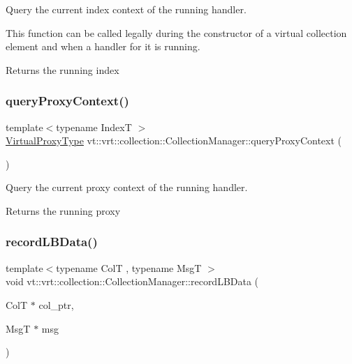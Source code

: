 Query the current index context of the running handler. 

This function can be called legally during the constructor of a virtual collection element and when a handler for it is running.

\begin{DoxyReturn}{Returns}
the running index 
\end{DoxyReturn}
\mbox{\label{structvt_1_1vrt_1_1collection_1_1_collection_manager_a77d8832834659c44badf499c4770777b}} 
\subsubsection{\texorpdfstring{query\+Proxy\+Context()}{queryProxyContext()}}
{\footnotesize\ttfamily template$<$typename IndexT $>$ \\
\hyperlink{namespacevt_a1b417dd5d684f045bb58a0ede70045ac}{Virtual\+Proxy\+Type} vt\+::vrt\+::collection\+::\+Collection\+Manager\+::query\+Proxy\+Context (\begin{DoxyParamCaption}{ }\end{DoxyParamCaption})\hspace{0.3cm}{\ttfamily [static]}}



Query the current proxy context of the running handler. 

\begin{DoxyReturn}{Returns}
the running proxy 
\end{DoxyReturn}
\mbox{\label{structvt_1_1vrt_1_1collection_1_1_collection_manager_a530e4c24e204a0a97317e1245a09d54c}} 
\subsubsection{\texorpdfstring{record\+L\+B\+Data()}{recordLBData()}}
{\footnotesize\ttfamily template$<$typename ColT , typename MsgT $>$ \\
void vt\+::vrt\+::collection\+::\+Collection\+Manager\+::record\+L\+B\+Data (\begin{DoxyParamCaption}\item[{ColT $\ast$}]{col\+\_\+ptr,  }\item[{MsgT $\ast$}]{msg }\end{DoxyParamCaption})\hspace{0.3cm}{\ttfamily [static]}}



